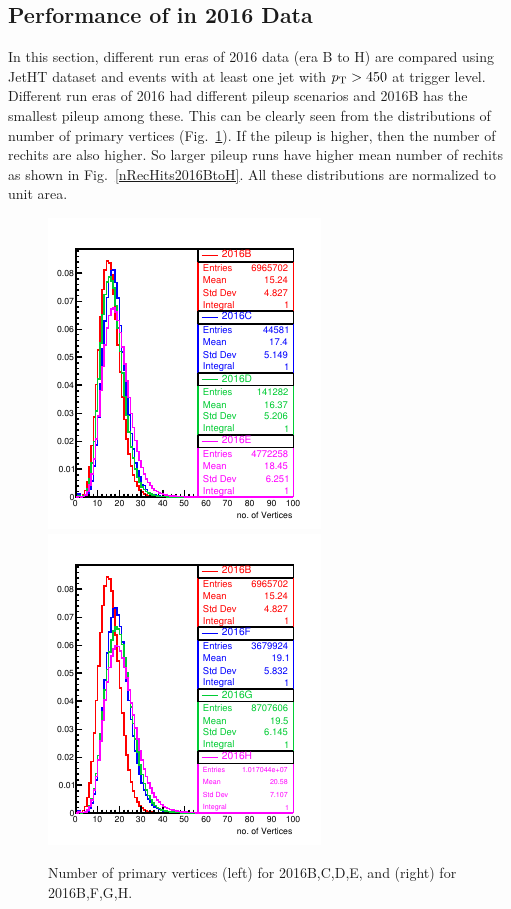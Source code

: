 \subsection{Performance of \ratiosl in 2016 Data}
In this section, different run eras of 2016 data (era B to H) are compared using JetHT dataset and events with 
at least one jet with $p_{\mathrm{T}} > 450$ \gev at trigger level.
Different run eras of 2016 had different pileup scenarios and 2016B has the 
smallest pileup among these. This can be clearly seen from the distributions 
of number of primary vertices (Fig.~\ref{nVtx2016BtoH}).
 If the pileup is higher, then the number of rechits 
are also higher. So larger pileup runs have higher mean number of rechits as 
shown in Fig.~\ref{nRecHits2016BtoH}. All these distributions are
normalized to unit area.


\begin{figure}[!h] %
\centering
\includegraphics[width=0.45\linewidth]{../Figures/Chap2/ImageFiles_HF/BasicPics/Comp2016/nVtx2016BtoE.pdf}
\includegraphics[width=0.45\linewidth]{../Figures/Chap2/ImageFiles_HF/BasicPics/Comp2016/nVtx2016BFGH.pdf}
\caption[No. of primary vertices for 2016 run eras]{Number of primary vertices (left) for 2016B,C,D,E, and (right) for 2016B,F,G,H.}
\label{nVtx2016BtoH}
\end{figure}

